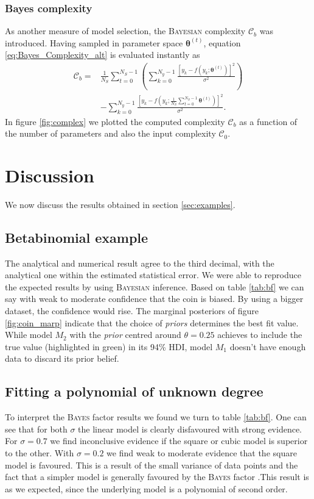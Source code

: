 \documentclass[%
 reprint,
 amsmath,amssymb,
 aps,
]{revtex4-1}
\newcommand{\btheta}{\boldsymbol{\theta}}
\begin{document}
\vspace{-1.2cm}
\subsubsection{\textbf{Bayes complexity}}
\noindent As another measure of model selection, the \textsc{Bayesian} complexity $\mathcal{C}_b$ was introduced. Having sampled in parameter space $\btheta^{(t)}$, equation \eqref{eq:Bayes_Complexity_alt} is evaluated instantly as \cite{wuerz} \begin{align*}\mathcal{C}_b=&\frac{1}{N_S}\sum_{t=0}^{N_S-1}\left(\sum_{k=0}^{N_y-1}\frac{[y_k-f(y_k;\btheta^{(t)})]^2}{\sigma^2}\right)\\&-\sum_{k=0}^{N_y-1}\frac{[y_k-f(y_k;\frac{1}{N_S}\sum_{t=0}^{N_S-1}\btheta^{(t)})]^2}{\sigma^2}.\end{align*}
In figure \ref{fig:complex} we plotted the computed complexity $\mathcal{C}_b$ as a function of the number of parameters and also the input complexity $\mathcal{C}_0$.


\section{Discussion}
\noindent We now discuss the results obtained in section \eqref{sec:examples}.
\subsection{Betabinomial example}
\noindent The analytical and numerical result agree to the third decimal, with the analytical one within the estimated statistical error. We were able to reproduce the expected results by using \textsc{Bayesian} inference.  Based on table \ref{tab:bf} we can say with weak to moderate confidence that the coin is biased. By using a bigger dataset, the confidence would rise. The marginal posteriors of figure \ref{fig:coin_marp} indicate that the choice of \emph{priors} determines the best fit value. While model $M_2$ with the \emph{prior} centred around  $\theta=0.25$ achieves to include the true value (highlighted in green) in its 94\% HDI, model $M_1$ doesn't have enough data to discard its prior belief. 
\subsection{Fitting a polynomial of unknown degree}
\noindent To interpret the \textsc{Bayes} factor results we found we turn to table \ref{tab:bf}. One can see that for both $\sigma$ the linear model is clearly disfavoured with strong evidence. For $\sigma=0.7$ we find inconclusive evidence if the square or cubic model is superior to the other. With $\sigma=0.2$ we find weak to moderate evidence that the square model is favoured. This is a result of the small variance of data points and the fact that a simpler model is generally favoured by the \textsc{Bayes} factor \cite{sivia}.This result is as we expected, since the underlying model is a polynomial of second order. 
\end{document}

